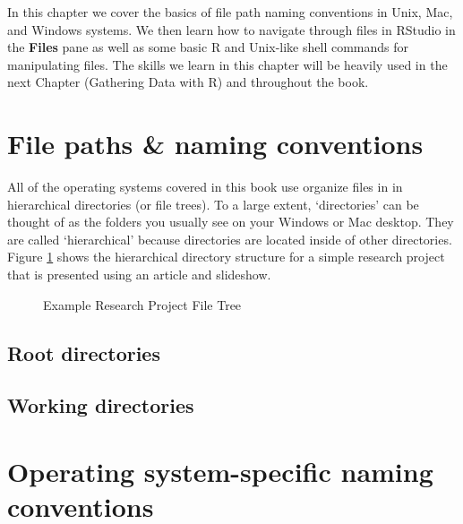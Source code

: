 \documentclass[ChapterTOCs,krantz1]{krantz}\usepackage{graphicx, color}
\begin{document}
In this chapter we cover the basics of file path naming conventions in Unix, Mac, and Windows systems. We then learn how to navigate through files in RStudio in the {\bf{Files}} pane as well as some basic R and Unix-like shell commands for manipulating files. The skills we learn in this chapter will be heavily used in the next Chapter (Gathering Data with R) and throughout the book.

\section{File paths \& naming conventions}

All of the operating systems covered in this book use organize files in in hierarchical directories (or file trees). To a large extent, `directories' can be thought of as the folders you usually see on your Windows or Mac desktop. They are called `hierarchical' because directories are located inside of other directories. Figure \ref{ExampleTree} shows the hierarchical directory structure for a simple research project that is presented using an article and slideshow.

\clearpage
\thispagestyle{plain}
\begin{landscape}
\begin{figure}[th!]
    \caption{Example Research Project File Tree}
    \label{ExampleTree}
    \begin{center}
    
    
    \end{center}
\end{figure}
\end{landscape}

\subsection{Root directories}

\subsection{Working directories}

\section{Operating system-specific naming conventions}
\end{document}
